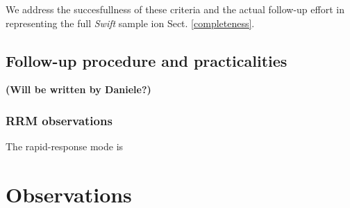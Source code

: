 \documentclass{aa}    %
\newcommand\todo[1]{\textbf{(#1)}}
\begin{document}
We address the succesfullness of these criteria and the actual follow-up effort
in representing the full \textit{Swift} sample ion Sect. \ref{completeness}.


\subsection{Follow-up procedure and practicalities}

\todo{Will be written by Daniele?}



\subsubsection{RRM observations} \label{RRM}
The rapid-response mode is 


\section{Observations} \label{obs}
\end{document}
